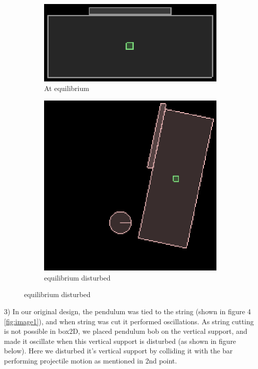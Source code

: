 \documentclass[a4paper,11pt]{article}
\begin{document}
{\begin{figure}[ht!]
\centering
\begin{subfigure}{.5\textwidth}
  \centering
  \includegraphics[width=.4\linewidth]{images/image5}
  \caption{At equilibrium}
  \label{fig:image5}
\end{subfigure}%
\begin{subfigure}{.5\textwidth}
  \centering
  \includegraphics[width=.4\linewidth]{images/image6}
  \caption{equilibrium disturbed}
  \label{fig:image6}
\end{subfigure}
\end{figure}

3) In our original design, the pendulum was tied to the string (shown in figure 4 \ref{fig:image1}), and when string was cut it performed oscillations. As string cutting is not possible in box2D, we placed pendulum bob on the vertical support, and made it oscillate when this vertical support is disturbed (as shown in figure below). Here we disturbed it's vertical support by colliding it with the bar performing projectile motion as mentioned in 2nd point.\\

}
\end{document}
